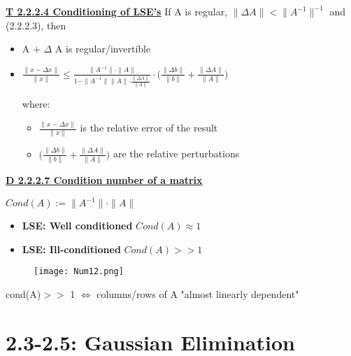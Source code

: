 \documentclass[8pt]{extreport}
\begin{document}
\underline{\textbf{T 2.2.2.4 Conditioning of LSE's}} If A is regular, $\parallel \Delta A \parallel < \parallel A^{-1} \parallel^{-1}$ and (2.2.2.3), then 
\begin{itemize}
\item A + $\Delta$ A is regular/invertible
\item 
\begin{center}
$\frac{\parallel x - \Delta x \parallel}{\parallel x \parallel} \leq \frac{\parallel A^{-1}\parallel \cdot \parallel A \parallel}{1- \parallel A^{-1}\parallel \parallel A \parallel \cdot \frac{\parallel \Delta A \parallel}{\parallel A \parallel}}\cdot \big( \frac{\parallel \Delta b \parallel}{\parallel b \parallel} + \frac{\parallel \Delta A \parallel}{\parallel A \parallel} \big)$
\end{center}
where:
\begin{itemize}
\item $\frac{\parallel x - \Delta x \parallel}{\parallel x \parallel}$ is the relative error of the result 
\item $\big( \frac{\parallel \Delta b \parallel}{\parallel b \parallel} + \frac{\parallel \Delta A \parallel}{\parallel A \parallel} \big)$ are the relative perturbations
\end{itemize}

\end{itemize}

\underline{\textbf{D 2.2.2.7 Condition number of a matrix}}
\begin{center}
$Cond(A) := \parallel A^{-1} \parallel \cdot \parallel A \parallel$
\end{center}
\begin{itemize}
\item \textbf{LSE: Well conditioned} $Cond(A) \approx 1$
\item \textbf{LSE: Ill-conditioned} $Cond(A) >> 1$
\end{itemize}
\begin{figure}[H]
\centering
\texttt{[image: Num12.png]}
\end{figure}

\begin{center}
cond(A)$>>$ 1 $\iff$ columns/rows of A "almost linearly dependent"
\end{center}
\section{2.3-2.5: Gaussian Elimination}
\end{document}
